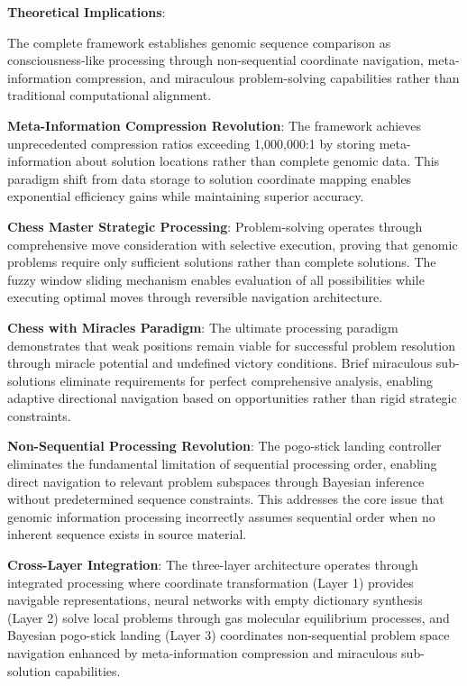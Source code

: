 \documentclass[12pt,a4paper]{article}
\begin{document}
\begin{table}[H]
\textbf{Theoretical Implications}:

The complete framework establishes genomic sequence comparison as consciousness-like processing through non-sequential coordinate navigation, meta-information compression, and miraculous problem-solving capabilities rather than traditional computational alignment.

\textbf{Meta-Information Compression Revolution}: The framework achieves unprecedented compression ratios exceeding 1,000,000:1 by storing meta-information about solution locations rather than complete genomic data. This paradigm shift from data storage to solution coordinate mapping enables exponential efficiency gains while maintaining superior accuracy.

\textbf{Chess Master Strategic Processing}: Problem-solving operates through comprehensive move consideration with selective execution, proving that genomic problems require only sufficient solutions rather than complete solutions. The fuzzy window sliding mechanism enables evaluation of all possibilities while executing optimal moves through reversible navigation architecture.

\textbf{Chess with Miracles Paradigm}: The ultimate processing paradigm demonstrates that weak positions remain viable for successful problem resolution through miracle potential and undefined victory conditions. Brief miraculous sub-solutions eliminate requirements for perfect comprehensive analysis, enabling adaptive directional navigation based on opportunities rather than rigid strategic constraints.

\textbf{Non-Sequential Processing Revolution}: The pogo-stick landing controller eliminates the fundamental limitation of sequential processing order, enabling direct navigation to relevant problem subspaces through Bayesian inference without predetermined sequence constraints. This addresses the core issue that genomic information processing incorrectly assumes sequential order when no inherent sequence exists in source material.

\textbf{Cross-Layer Integration}: The three-layer architecture operates through integrated processing where coordinate transformation (Layer 1) provides navigable representations, neural networks with empty dictionary synthesis (Layer 2) solve local problems through gas molecular equilibrium processes, and Bayesian pogo-stick landing (Layer 3) coordinates non-sequential problem space navigation enhanced by meta-information compression and miraculous sub-solution capabilities.


\end{table}
\end{document}
